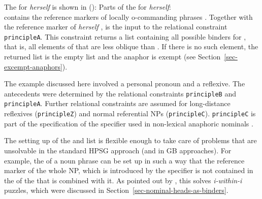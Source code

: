\documentclass[output=paper
	        ,collection
	        ,collectionchapter
 	        ,biblatex
                ,babelshorthands
                ,newtxmath
                ,draftmode
                ,colorlinks, citecolor=brown
]{langscibook}
\begin{document}
The \synsemv for \emph{herself} is shown in ():
\eas
Parts of the \synsemv for \emph{herself}:\\
\zs
\lista contains the reference markers of locally o-commanding phrases . Together with the
reference marker of \emph{herself} ,  is the input to the relational constraint
\texttt{principleA}. This constraint returns a list containing all possible binders for ,
that is, all elements of  that are less oblique than . If there is no such element,
the returned list is the empty list and the anaphor is exempt (see Section~\ref{sec-excempt-anaphors}).

The example discussed here involved a personal pronoun and a reflexive. The antecedents were
determined by the relational constraints \texttt{principleB} and \texttt{prin\-cipleA}. Further
relational constraints are assumed for long-distance reflexives (\texttt{principleZ}) and normal
referential NPs (\texttt{principleC}). \texttt{principleC} is part of the specification of the
specifier used in non-lexical anaphoric nominals \citep[]{Branco2002a}.

The setting up of the \lista and \listu list is flexible enough to take care of problems that are
unsolvable in the standard HPSG approach (and in GB approaches). For example, the \listul of a noun
phrase can be set up in such a way that the reference marker of the whole NP, which is introduced by
the specifier is not contained in the \listul of the \nbar that is combined with it. As pointed out
by \citet[]{Branco2002a}, this solves \emph{i-within-i} puzzles, which were discussed in Section~\ref{sec-nominal-heads-as-binders}.
\end{document}

